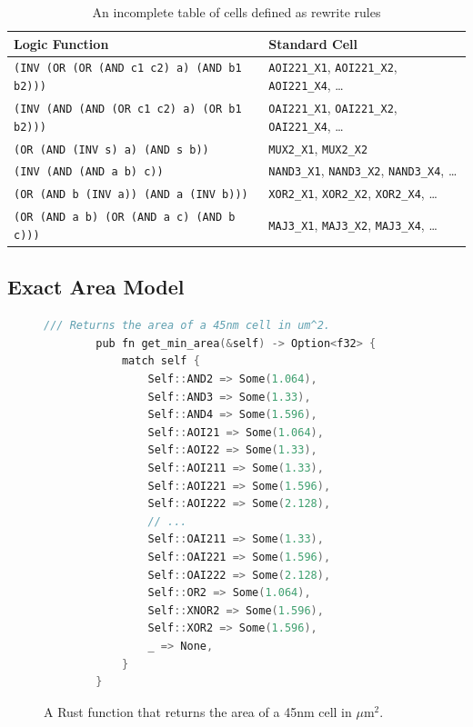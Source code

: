 \documentclass[10pt,letterpaper]{article}
\begin{document}
\begin{table}[h]
    \centering
    \begin{tabular}{ll}
        \toprule
        \textbf{Logic Function}                            & \textbf{Standard Cell}                                                \\ \midrule
        \texttt{(INV (OR (OR (AND c1 c2) a) (AND b1 b2)))} & \texttt{AOI221\_X1}, \texttt{AOI221\_X2}, \texttt{AOI221\_X4}, \ldots \\
        \texttt{(INV (AND (AND (OR c1 c2) a) (OR b1 b2)))} & \texttt{OAI221\_X1}, \texttt{OAI221\_X2}, \texttt{OAI221\_X4}, \ldots \\
        \texttt{(OR (AND (INV s) a) (AND s b))}            & \texttt{MUX2\_X1}, \texttt{MUX2\_X2}                                  \\
        \texttt{(INV (AND (AND a b) c))}                   & \texttt{NAND3\_X1}, \texttt{NAND3\_X2}, \texttt{NAND3\_X4}, \ldots    \\
        \texttt{(OR (AND b (INV a)) (AND a (INV b)))}      & \texttt{XOR2\_X1}, \texttt{XOR2\_X2}, \texttt{XOR2\_X4}, \ldots       \\
        \texttt{(OR (AND a b) (OR (AND a c) (AND b c)))}   & \texttt{MAJ3\_X1}, \texttt{MAJ3\_X2}, \texttt{MAJ3\_X4}, \ldots       \\
        \bottomrule
    \end{tabular}
    \caption{An incomplete table of cells defined as rewrite rules}\label{tab:morecells}
\end{table}

\subsection{Exact Area Model}\label{sec:alt:area}

\begin{figure}[h!]
    \centering
    \begin{lstlisting}[language=c++, caption={Cell Area Cost Function}, label={lst:area-code}]
        /// Returns the area of a 45nm cell in um^2.
        pub fn get_min_area(&self) -> Option<f32> {
            match self {
                Self::AND2 => Some(1.064),
                Self::AND3 => Some(1.33),
                Self::AND4 => Some(1.596),
                Self::AOI21 => Some(1.064),
                Self::AOI22 => Some(1.33),
                Self::AOI211 => Some(1.33),
                Self::AOI221 => Some(1.596),
                Self::AOI222 => Some(2.128),
                // ...
                Self::OAI211 => Some(1.33),
                Self::OAI221 => Some(1.596),
                Self::OAI222 => Some(2.128),
                Self::OR2 => Some(1.064),
                Self::XNOR2 => Some(1.596),
                Self::XOR2 => Some(1.596),
                _ => None,
            }
        }
    \end{lstlisting}
    \caption{A Rust function that returns the area of a 45nm cell in $\mu\text{m}^2$.}
\end{figure}
\end{document}
